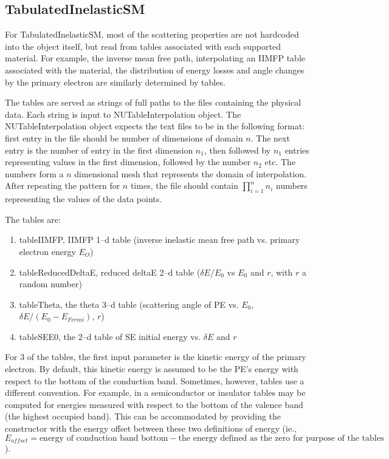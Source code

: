 \subsection{TabulatedInelasticSM}
For TabulatedInelasticSM, most of the scattering properties are not hardcoded into the object itself, but read from tables associated with each supported material. For example, the inverse mean free path, interpolating an IIMFP table associated with the material, the distribution of energy losses and angle changes by the primary electron are similarly determined by tables. 

The tables are served as strings of full paths to the files containing the physical data. Each string is input to NUTableInterpolation object. The NUTableInterpolation object expects the text files to be in the following format: first entry in the file should be number of dimensions of domain $n$. The next entry is the number of entry in the first dimension $n_1$, then followed by $n_1$ entries representing values in the first dimension, followed by the number $n_2$ etc. The numbers form a $n$ dimensional mesh that represents the domain of interpolation. After repeating the pattern for $n$ times, the file should contain $\prod_{i=1}^{n}n_i$ numbers representing the values of the data points. 

The tables are:
\begin{enumerate}
    \item tableIIMFP, IIMFP 1--d table (inverse inelastic mean free path vs. primary electron energy $E_O$)
    \item tableReducedDeltaE, reduced deltaE 2--d table ($\delta E/E_0$ vs $E_0$ and $r$, with $r$ a random number)
    \item tableTheta, the theta 3--d table (scattering angle of PE vs. $E_0$, $\delta E/(E_0-E_{Fermi})$, $r$)
    \item tableSEE0, the 2--d table of SE initial energy vs. $\delta E$ and $r$
\end{enumerate}

For 3 of the tables, the first input parameter is the kinetic energy of the primary electron. By default, this kinetic energy is assumed to be the PE's energy with respect to the bottom of the conduction band. Sometimes, however, tables use a different convention. For example, in a semiconductor or insulator tables may be computed for energies measured with respect to the bottom of the valence band (the highest occupied band). This can be accommodated by providing the constructor with the energy offset between these two definitions of energy (ie., $E_{offset} = \text{energy of conduction band bottom} - \text{the energy defined as the zero for purpose of the tables}$).

